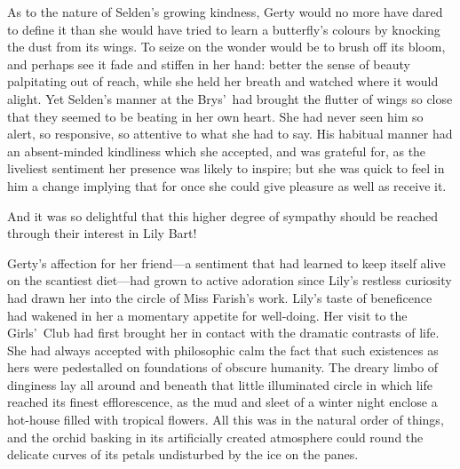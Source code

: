 \documentclass[12pt,a4paper]{book}
\begin{document}
As to the nature of Selden's growing kindness, Gerty would no
more have dared to define it than she would have tried to learn a
butterfly's colours by knocking the dust from its wings. To seize
on the wonder would be to brush off its bloom, and perhaps see it
fade and stiffen in her hand: better the sense of beauty
palpitating out of reach, while she held her breath and watched
where it would alight. Yet Selden's manner at the Brys'\ had
brought the flutter of wings so close that they seemed to be
beating in her own heart. She had never seen him so alert, so
responsive, so attentive to what she had to say. His habitual
manner had an absent-minded kindliness which she accepted, and
was grateful for, as the liveliest sentiment her presence was
likely to inspire; but she was quick to feel in him a change
implying that for once she could give pleasure as well as receive
it.





And it was so delightful that this higher degree of sympathy
should be reached through their interest in Lily Bart!





Gerty's affection for her friend---a sentiment that had learned to
keep itself alive on the scantiest diet---had grown to active
adoration since Lily's restless curiosity had drawn her into the
circle of Miss Farish's work. Lily's taste of beneficence had
wakened in her a momentary appetite for well-doing. Her visit to
the Girls'\ Club had first brought her in contact with the
dramatic contrasts of life. She had always accepted with
philosophic calm the fact that such existences as hers were
pedestalled on foundations of obscure humanity. The dreary limbo
of dinginess lay all around and beneath that little illuminated
circle in which life reached its finest efflorescence, as the mud
and sleet of a winter night enclose a hot-house filled with
tropical flowers. All this was in the natural order of things,
and the orchid basking in its artificially created atmosphere
could round the delicate curves of its petals undisturbed by the
ice on the panes.
\end{document}
